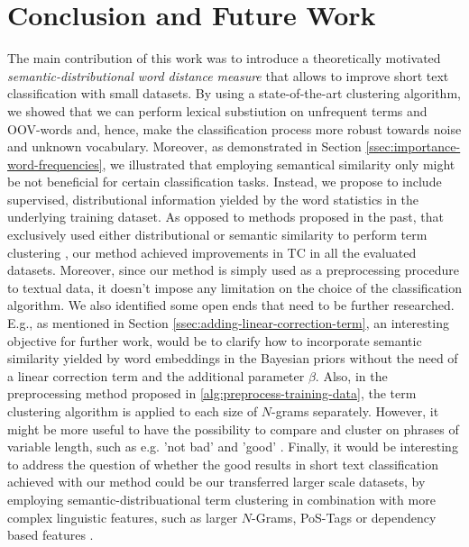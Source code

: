 
\chapter{Conclusion and Future Work}
\label{ch:Conclusion}

The main contribution of this work was to introduce a theoretically motivated \emph{semantic-distributional word distance measure} that allows to improve 
short text classification with small datasets. By using a state-of-the-art clustering algorithm, we showed that we can perform 
lexical substiution on unfrequent terms and OOV-words and, hence, make the classification process more robust towards noise and
unknown vocabulary. Moreover, as demonstrated in Section \ref{ssec:importance-word-frequencies}, we illustrated that employing semantical
similarity only might be not beneficial for certain classification tasks. Instead, we propose to include supervised, distributional information yielded 
by the word statistics in the underlying training dataset. As opposed to methods proposed in the past, that exclusively used either distributional or semantic
similarity to perform term clustering \cite{baker1998distributional, ma2015using}, our method achieved improvements in TC in all the evaluated datasets.
Moreover, since our method is simply used as a preprocessing procedure to textual data, it doesn't impose any limitation on the choice 
of the classification algorithm. We also identified some open ends that need to be further researched. 
E.g., as mentioned in Section \ref{ssec:adding-linear-correction-term}, an interesting objective for further work, would be to clarify how to 
incorporate semantic similarity yielded by word embeddings in the Bayesian priors without the need of a linear correction term and 
the additional parameter $\beta$. Also, in the preprocessing method proposed in \ref{alg:preprocess-training-data}, the term clustering 
algorithm is applied to each size of $N$-grams separately. However, it might be more useful to have the possibility to compare and cluster on phrases of variable length, such as  e.g. 'not bad' and 'good' \cite{liu2015learning}. 
Finally, it would be interesting to address the question of whether 
the good results in short text classification achieved with our method
could be our transferred larger scale datasets, by employing semantic-distribuational term clustering in combination with more complex linguistic features, 
such as larger $N$-Grams, PoS-Tags or dependency based features \cite{komninos2016dependency}. 
